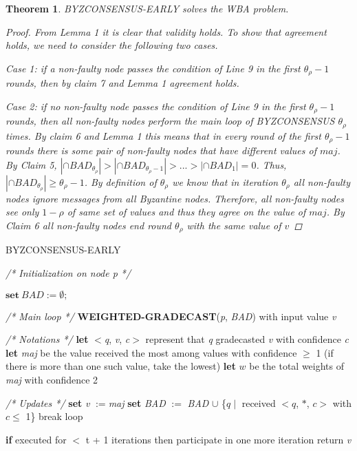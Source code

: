 \documentclass[conference]{IEEEtran}
\newtheorem{t1}{Theorem}
\begin{document}
\begin{t1}
BYZCONSENSUS-EARLY solves the WBA problem.
\begin{proof}
From Lemma 1 it is clear that validity holds. To show that agreement holds, we need to consider the following two cases. 

Case 1: if a non-faulty node passes the condition of Line 9 in the first $\theta_\rho - 1$ rounds, then by claim 7 and Lemma 1 agreement holds.  

Case 2: if no non-faulty node passes the condition of Line 9 in the first $\theta_\rho - 1$ rounds, then all non-faulty nodes perform the main loop of BYZCONSENSUS $\theta_\rho$ times. By claim 6 and Lemma 1 this means that in every round of the first $\theta_\rho - 1$ rounds there is some pair of non-faulty nodes that have different values of $maj$. By Claim 5, $|\cap BAD_{\theta_\rho}| > | \cap BAD_{\theta_\rho - 1}| > ... > |\cap BAD_1| = 0$. Thus, $|\cap BAD_{\theta_\rho}| \geq \theta_\rho - 1$. By definition of $\theta_\rho$ we know that in iteration $\theta_\rho$ all non-faulty nodes ignore messages from all Byzantine nodes. Therefore, all non-faulty nodes see only $1 - \rho$ of same set of values  and thus they agree on the value of $maj$. By Claim 6 all non-faulty nodes end round $\theta_\rho$ with the same value of $v$
\end{proof}
\end{t1}



\begin{algorithm}
\caption{BYZCONSENSUS-EARLY}\label{euclid}
\textit{/* Initialization on node p */}
\begin{algorithmic}[1]
\STATE $\textbf{set} ~\textit{BAD} := \emptyset;$
\item[]
\item[]
\textit{/* Main loop */}
\STATE \textbf{WEIGHTED-GRADECAST}(\textit{p}, \textit{BAD}) with input value \textit{v}
\item[]
\item[]
\textit{/* Notations */}
\STATE \textbf{let} $<$\textit{q}, \textit{v}, \textit{c}$>$ represent that \textit{q} gradecasted \textit{v} with confidence \textit{c}
\STATE \textbf{let} \textit{maj} be the value received the most among values with confidence $\geq$ 1
(if there is more than one such value, take the lowest)
\STATE \textbf{let} $w$ be the total weights of \textit{maj} with confidence 2
\item[]
\item[]
\textit{/* Updates */}
\STATE \textbf{set} \textit{v} $:=$\textit{maj}
\STATE \textbf{set} \textit{BAD} $:=$ \textit{BAD} $\cup$ \{$q \mid$ received $<q$, $\ast$, $c>$ with $c \leq$ 1\}
\STATE break loop
\ENDIF
\ENDFOR
\item[]
\STATE \textbf{if} executed for $<$ t + 1 iterations then participate in one more iteration
\STATE return \textit{v}

\end{algorithmic}
\end{algorithm}
\end{document}
